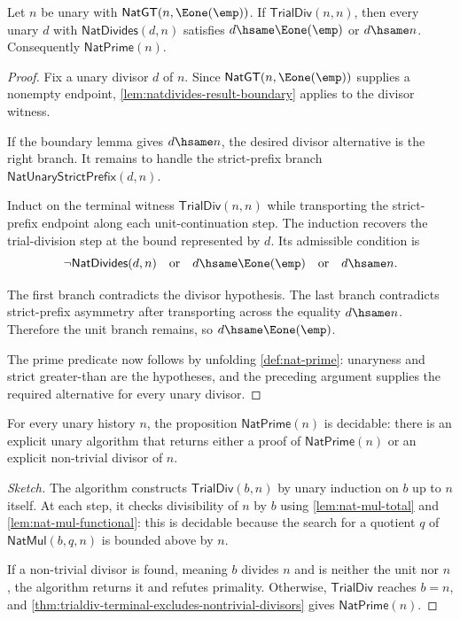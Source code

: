 \begin{theorem}
\label{thm:trialdiv-terminal-excludes-nontrivial-divisors}
Let $n$ be unary with $\mathsf{NatGT}(n,\Eone(\emp))$. If
$\mathsf{TrialDiv}(n,n)$, then every unary $d$ with
$\mathsf{NatDivides}(d,n)$ satisfies $d\hsame\Eone(\emp)$ or $d\hsame n$.
Consequently $\mathsf{NatPrime}(n)$.
\end{theorem}
\begin{proof}
Fix a unary divisor $d$ of $n$. Since $\mathsf{NatGT}(n,\Eone(\emp))$ supplies
a nonempty endpoint, \autoref{lem:natdivides-result-boundary} applies to the
divisor witness.

If the boundary lemma gives $d\hsame n$, the desired divisor alternative is the
right branch. It remains to handle the strict-prefix branch
$\mathsf{NatUnaryStrictPrefix}(d,n)$.

Induct on the terminal witness $\mathsf{TrialDiv}(n,n)$ while transporting the
strict-prefix endpoint along each unit-continuation step. The induction
recovers the trial-division step at the bound represented by $d$. Its
admissible condition is
$$
\neg\mathsf{NatDivides}(d,n)
\quad\text{or}\quad
d\hsame\Eone(\emp)
\quad\text{or}\quad
d\hsame n.
$$

The first branch contradicts the divisor hypothesis. The last branch
contradicts strict-prefix asymmetry after transporting across the equality
$d\hsame n$. Therefore the unit branch remains, so
$d\hsame\Eone(\emp)$.

The prime predicate now follows by unfolding \autoref{def:nat-prime}: unaryness
and strict greater-than are the hypotheses, and the preceding argument supplies
the required alternative for every unary divisor.
\end{proof}

\begin{theorem}
\label{thm:prime-decidable}
For every unary history \(n\), the proposition \(\mathsf{NatPrime}(n)\) is decidable: there is an explicit unary algorithm that returns either a proof of \(\mathsf{NatPrime}(n)\) or an explicit non-trivial divisor of \(n\).
\end{theorem}
\begin{proof}[Sketch]
The algorithm constructs $\mathsf{TrialDiv}(b,n)$ by unary induction on $b$
up to $n$ itself. At each step, it checks divisibility of $n$ by $b$ using
\autoref{lem:nat-mul-total} and \autoref{lem:nat-mul-functional}: this is
decidable because the search for a quotient $q$ of $\mathsf{NatMul}(b,q,n)$ is
bounded above by $n$.

If a non-trivial divisor is found, meaning $b$ divides $n$ and is neither the
unit nor $n$, the algorithm returns it and refutes primality. Otherwise,
$\mathsf{TrialDiv}$ reaches $b=n$, and
\autoref{thm:trialdiv-terminal-excludes-nontrivial-divisors} gives
$\mathsf{NatPrime}(n)$.
\end{proof}
